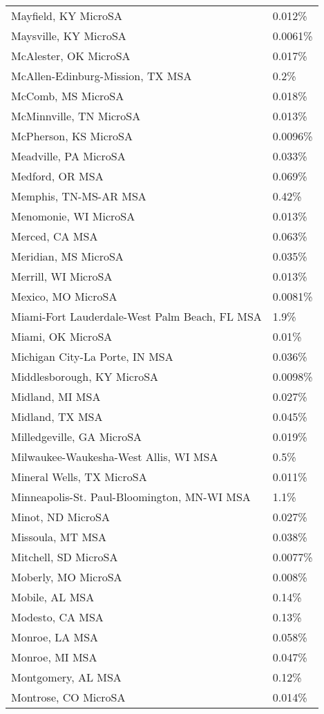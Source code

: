 \begin{longtable}[]{@{}ll@{}}
Mayfield, KY MicroSA & 0.012\% \\
Maysville, KY MicroSA & 0.0061\% \\
McAlester, OK MicroSA & 0.017\% \\
McAllen-Edinburg-Mission, TX MSA & 0.2\% \\
McComb, MS MicroSA & 0.018\% \\
McMinnville, TN MicroSA & 0.013\% \\
McPherson, KS MicroSA & 0.0096\% \\
Meadville, PA MicroSA & 0.033\% \\
Medford, OR MSA & 0.069\% \\
Memphis, TN-MS-AR MSA & 0.42\% \\
Menomonie, WI MicroSA & 0.013\% \\
Merced, CA MSA & 0.063\% \\
Meridian, MS MicroSA & 0.035\% \\
Merrill, WI MicroSA & 0.013\% \\
Mexico, MO MicroSA & 0.0081\% \\
Miami-Fort Lauderdale-West Palm Beach, FL MSA & 1.9\% \\
Miami, OK MicroSA & 0.01\% \\
Michigan City-La Porte, IN MSA & 0.036\% \\
Middlesborough, KY MicroSA & 0.0098\% \\
Midland, MI MSA & 0.027\% \\
Midland, TX MSA & 0.045\% \\
Milledgeville, GA MicroSA & 0.019\% \\
Milwaukee-Waukesha-West Allis, WI MSA & 0.5\% \\
Mineral Wells, TX MicroSA & 0.011\% \\
Minneapolis-St. Paul-Bloomington, MN-WI MSA & 1.1\% \\
Minot, ND MicroSA & 0.027\% \\
Missoula, MT MSA & 0.038\% \\
Mitchell, SD MicroSA & 0.0077\% \\
Moberly, MO MicroSA & 0.008\% \\
Mobile, AL MSA & 0.14\% \\
Modesto, CA MSA & 0.13\% \\
Monroe, LA MSA & 0.058\% \\
Monroe, MI MSA & 0.047\% \\
Montgomery, AL MSA & 0.12\% \\
Montrose, CO MicroSA & 0.014\% \\

\end{longtable}
